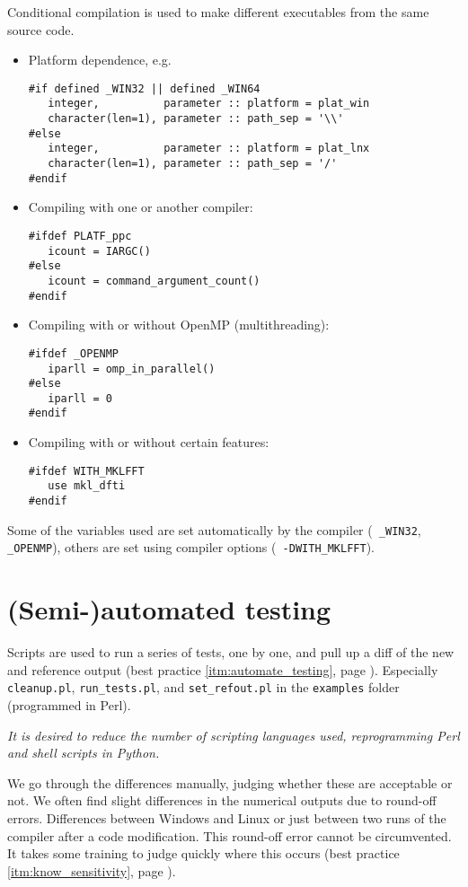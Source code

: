 \documentclass[12pt]{report}
\begin{document}
Conditional compilation is used to make different executables from the same
source code.
\begin{itemize}
\item Platform dependence, e.g.\
{\small\begin{verbatim}
#if defined _WIN32 || defined _WIN64
   integer,          parameter :: platform = plat_win
   character(len=1), parameter :: path_sep = '\\'
#else
   integer,          parameter :: platform = plat_lnx
   character(len=1), parameter :: path_sep = '/'
#endif
\end{verbatim}}
\item Compiling with one or another compiler:
{\small\begin{verbatim}
#ifdef PLATF_ppc
   icount = IARGC()
#else
   icount = command_argument_count()
#endif
\end{verbatim}}
\item Compiling with or without OpenMP (multithreading):
{\small\begin{verbatim}
#ifdef _OPENMP
   iparll = omp_in_parallel()
#else
   iparll = 0
#endif
\end{verbatim}}
\item Compiling with or without certain features:
{\small\begin{verbatim}
#ifdef WITH_MKLFFT
   use mkl_dfti
#endif
\end{verbatim}}
\end{itemize}
Some of the variables used are set automatically by the compiler ({\tt
\_WIN32}, {\tt \_OPENMP}), others are set using compiler options ({\tt
-DWITH\_MKLFFT}).

\section{(Semi-)automated testing}

Scripts are used to run a series of tests, one by one, and pull up a diff
of the new and reference output (best practice \ref{itm:automate_testing},
page \pageref{itm:automate_testing}). Especially {\tt cleanup.pl},
{\tt run\_tests.pl}, and {\tt set\_refout.pl} in the {\tt examples} folder
(programmed in Perl).

{\em It is desired to reduce the number of scripting languages used,
reprogramming Perl and shell scripts in Python.}

We go through the differences manually, judging whether these are
acceptable or not. We often find slight differences in the numerical
outputs due to round-off errors. Differences between Windows and Linux or
just between two runs of the compiler after a code modification. This
round-off error cannot be circumvented. It takes some training to judge
quickly where this occurs (best practice \ref{itm:know_sensitivity}, page
\pageref{itm:know_sensitivity}).
\end{document}
